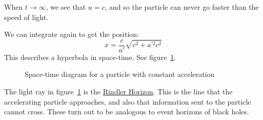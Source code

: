 \documentclass[../Main.tex]{subfiles}
\begin{document}
When $t \to \infty$, we see that $u = c$, and so the particle can never go faster than the speed of light.

We can integrate again to get the position:
\begin{equation*}
    x = \frac{c}{a'}\sqrt{c^2 + a^{\prime 2} c^2}
\end{equation*}
This describes a hyperbola in space-time. See figure~\ref{figConstAccelMotion}.
\begin{figure}[ht]
    \centering
    \caption{Space-time diagram for a particle with constant acceleration}
    \label{figConstAccelMotion}
\end{figure}
The light ray in figure~\ref{figConstAccelMotion} is the \underline{Rindler Horizon}. This is the line that the accelerating particle approaches, and also that information sent to the particle cannot cross. These turn out to be analogous to event horizons of black holes.
\end{document}
